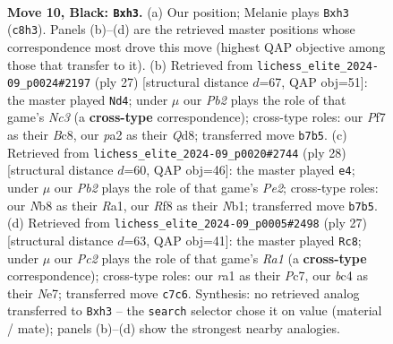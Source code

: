 \documentclass[11pt]{article}
\begin{document}
\clearpage

\begin{figure}[p]\centering
\begin{subfigure}{0.46\textwidth}\centering
\resizebox{\linewidth}{!}{%
\newchessgame
\chessboard[
  setfen={rnb1qrk1/ppp1pp1p/5bp1/3P4/2B1P3/B1P4N/P4PPP/R2QK2R b KQ - 0 10},
  showmover=false,
  pgfstyle=straightmove, color=movearrow, markmove={c8-h3}
]}
\caption{}
\end{subfigure}\hfill
\begin{subfigure}{0.46\textwidth}\centering
\resizebox{\linewidth}{!}{%
\newchessgame
\chessboard[
  setfen={r1bq1rk1/1pp2ppp/p1np4/2b5/4PP2/PPN5/1BPQB1PP/R3K2R b KQ - 0 14},
  showmover=false,
  pgfstyle=straightmove, color=movearrow, markmove={c6-d4}
]}
\caption{}
\end{subfigure}
\\[4pt]
\begin{subfigure}{0.46\textwidth}\centering
\resizebox{\linewidth}{!}{%
\newchessgame
\chessboard[
  setfen={r2qk2r/pp3pp1/2pb2b1/2np2P1/5P1p/3P4/PPQ1P1BP/RNB2RK1 w kq - 0 15},
  showmover=false,
  pgfstyle=straightmove, color=movearrow, markmove={e2-e4}
]}
\caption{}
\end{subfigure}\hfill
\begin{subfigure}{0.46\textwidth}\centering
\resizebox{\linewidth}{!}{%
\newchessgame
\chessboard[
  setfen={r2q1rk1/ppp1nppp/1b6/3pP3/3P4/2PBBP1P/P4P2/R2QK2R b KQ - 2 14},
  showmover=false,
  pgfstyle=straightmove, color=movearrow, markmove={a8-c8}
]}
\caption{}
\end{subfigure}
\caption{\textbf{Move 10, Black: \texttt{Bxh3}.} (a) Our position; Melanie plays \texttt{Bxh3} (\texttt{c8h3}). Panels (b)--(d) are the retrieved master positions whose correspondence most drove this move (highest QAP objective among those that transfer to it). (b) Retrieved from \texttt{lichess\_elite\_2024-09\_p0024\#2197} (ply 27) [structural distance $d$=67, QAP obj=51]: the master played \texttt{Nd4}; under $\mu$ our \emph{Pb2} plays the role of that game's \emph{Nc3} (a \textbf{cross-type} correspondence); cross-type roles: our \emph{P}f7 as their \emph{B}c8, our \emph{p}a2 as their \emph{Q}d8; transferred move \texttt{b7b5}. (c) Retrieved from \texttt{lichess\_elite\_2024-09\_p0020\#2744} (ply 28) [structural distance $d$=60, QAP obj=46]: the master played \texttt{e4}; under $\mu$ our \emph{Pb2} plays the role of that game's \emph{Pe2}; cross-type roles: our \emph{N}b8 as their \emph{R}a1, our \emph{R}f8 as their \emph{N}b1; transferred move \texttt{b7b5}. (d) Retrieved from \texttt{lichess\_elite\_2024-09\_p0005\#2498} (ply 27) [structural distance $d$=63, QAP obj=41]: the master played \texttt{Rc8}; under $\mu$ our \emph{Pc2} plays the role of that game's \emph{Ra1} (a \textbf{cross-type} correspondence); cross-type roles: our \emph{r}a1 as their \emph{P}c7, our \emph{b}c4 as their \emph{N}e7; transferred move \texttt{c7c6}. Synthesis: no retrieved analog transferred to \texttt{Bxh3} -- the \texttt{search} selector chose it on value (material / mate); panels (b)--(d) show the strongest nearby analogies.}
\label{fig:thought-m19}
\end{figure}
\end{document}
